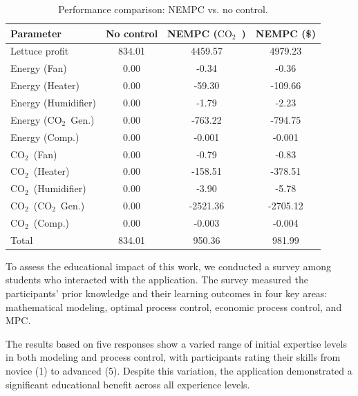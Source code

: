 \documentclass[conference]{IEEEtran}
\newcommand{\coo}{\ensuremath{\mathrm{CO_2}}}
\begin{document}
\begin{table}
    \centering
    \caption{Performance comparison: NEMPC {vs. } no control.}\label{tab:comparison}
    \begin{tabular}{lS[table-format=4.2]S[table-format=4.2]S[table-format=4.2]}
        \toprule
        Parameter           & {No control} & {NEMPC (\coo\ )} & {NEMPC (\$)} \\
        \midrule
        Lettuce profit      & 834.01       & 4459.57          & 4979.23      \\
        Energy (Fan)        & 0.00         & -0.34            & -0.36        \\
        Energy (Heater)     & 0.00         & -59.30           & -109.66      \\
        Energy (Humidifier) & 0.00         & -1.79            & -2.23        \\
        Energy (\coo\ Gen.) & 0.00         & -763.22          & -794.75      \\
        Energy (Comp.)      & 0.00         & -0.001           & -0.001       \\
        \coo\ (Fan)         & 0.00         & -0.79            & -0.83        \\
        \coo\ (Heater)      & 0.00         & -158.51          & -378.51      \\
        \coo\ (Humidifier)  & 0.00         & -3.90            & -5.78        \\
        \coo\ (\coo\ Gen.)  & 0.00         & -2521.36         & -2705.12     \\
        \coo\ (Comp.)       & 0.00         & -0.003           & -0.004       \\
        \midrule
        Total               & 834.01       & 950.36           & 981.99       \\
        \bottomrule
    \end{tabular}
\end{table}

To assess the educational impact of this work, we conducted a survey among students who interacted with the application. The survey measured the participants' prior knowledge and their learning outcomes in four key areas: mathematical modeling, optimal process control, economic process control, and MPC.\@

The results based on five responses show a varied range of initial expertise levels in both modeling and process control, with participants rating their skills from novice (1) to advanced (5). Despite this variation, the application demonstrated a significant educational benefit across all experience levels.
\end{document}
